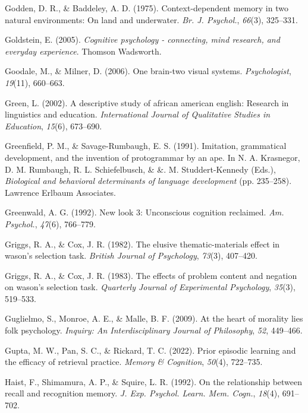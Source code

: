 \documentclass[
]{krantz}
\newlength{\cslhangindent}
\newenvironment{CSLReferences}[2] %
 {\begin{list}{}{%
  \setlength{\itemindent}{0pt}
  \setlength{\leftmargin}{0pt}
  \setlength{\parsep}{0pt}
  \ifodd #1
   \setlength{\leftmargin}{\cslhangindent}
   \setlength{\itemindent}{-1\cslhangindent}
  \fi
  \setlength{\itemsep}{#2\baselineskip}}}
 {\end{list}}
\begin{document}
\begin{CSLReferences}{1}{0}
Godden, D. R., \& Baddeley, A. D. (1975). Context-dependent memory in two natural environments: On land and underwater. \emph{Br. J. Psychol.}, \emph{66}(3), 325--331.

Goldstein, E. (2005). \emph{Cognitive psychology - connecting, mind research, and everyday experience}. Thomson Wadsworth.

Goodale, M., \& Milner, D. (2006). One brain-two visual systems. \emph{Psychologist}, \emph{19}(11), 660--663.

Green, L. (2002). A descriptive study of african american english: Research in linguistics and education. \emph{International Journal of Qualitative Studies in Education}, \emph{15}(6), 673--690.

Greenfield, P. M., \& Savage-Rumbaugh, E. S. (1991). Imitation, grammatical development, and the invention of protogrammar by an ape. In N. A. Krasnegor, D. M. Rumbaugh, R. L. Schiefelbusch, \& \&. M. Studdert-Kennedy (Eds.), \emph{Biological and behavioral determinants of language development} (pp. 235--258). Lawrence Erlbaum Associates.

Greenwald, A. G. (1992). New look 3: Unconscious cognition reclaimed. \emph{Am. Psychol.}, \emph{47}(6), 766--779.

Griggs, R. A., \& Cox, J. R. (1982). The elusive thematic-materials effect in wason's selection task. \emph{British Journal of Psychology}, \emph{73}(3), 407--420.

Griggs, R. A., \& Cox, J. R. (1983). The effects of problem content and negation on wason's selection task. \emph{Quarterly Journal of Experimental Psychology}, \emph{35}(3), 519--533.

Guglielmo, S., Monroe, A. E., \& Malle, B. F. (2009). At the heart of morality lies folk psychology. \emph{Inquiry: An Interdisciplinary Journal of Philosophy}, \emph{52}, 449--466.

Gupta, M. W., Pan, S. C., \& Rickard, T. C. (2022). Prior episodic learning and the efficacy of retrieval practice. \emph{Memory \& Cognition}, \emph{50}(4), 722--735.

Haist, F., Shimamura, A. P., \& Squire, L. R. (1992). On the relationship between recall and recognition memory. \emph{J. Exp. Psychol. Learn. Mem. Cogn.}, \emph{18}(4), 691--702.


\end{CSLReferences}
\end{document}
